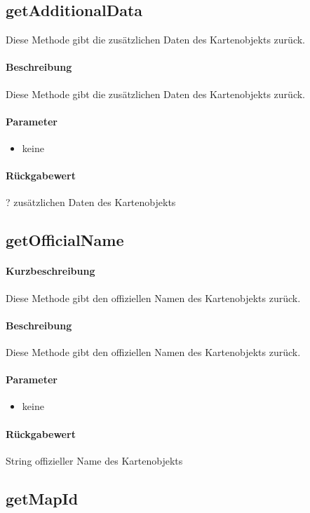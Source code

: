 \subsection{getAdditionalData}%
Diese Methode gibt die zusätzlichen Daten des Kartenobjekts zurück.
\paragraph*{Beschreibung}
Diese Methode gibt die zusätzlichen Daten des Kartenobjekts zurück.
\paragraph*{Parameter}
\begin{itemize}
    \item keine
\end{itemize}
\paragraph*{Rückgabewert}
? zusätzlichen Daten des Kartenobjekts

\subsection{getOfficialName}%
\paragraph*{Kurzbeschreibung}
Diese Methode gibt den offiziellen Namen des Kartenobjekts zurück.
\paragraph*{Beschreibung}
Diese Methode gibt den offiziellen Namen des Kartenobjekts zurück.
\paragraph*{Parameter}
\begin{itemize}
    \item keine
\end{itemize}
\paragraph*{Rückgabewert}
String offizieller Name des Kartenobjekts

\subsection{getMapId}%
